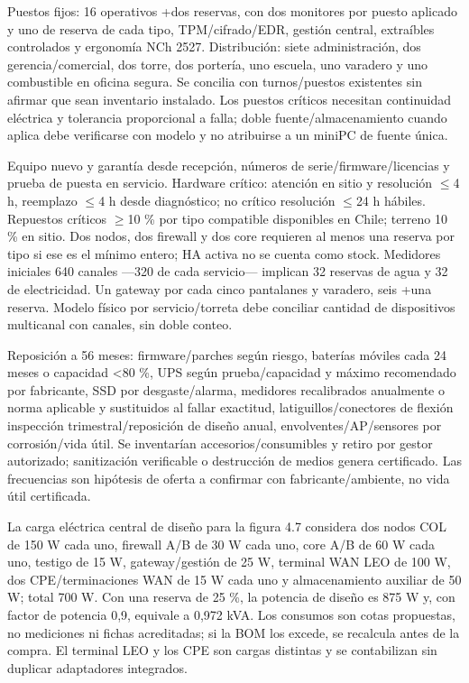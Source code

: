 \documentclass[11pt,letterpaper]{report}
\begin{document}
Puestos fijos: 16 operativos +dos reservas, con dos monitores por puesto aplicado y uno de reserva de cada tipo, TPM/cifrado/EDR, gestión central, extraíbles controlados y ergonomía NCh 2527. Distribución: siete administración, dos gerencia/comercial, dos torre, dos portería, uno escuela, uno varadero y uno combustible en oficina segura. Se concilia con turnos/puestos existentes sin afirmar que sean inventario instalado. Los puestos críticos necesitan continuidad eléctrica y tolerancia proporcional a falla; doble fuente/almacenamiento cuando aplica debe verificarse con modelo y no atribuirse a un miniPC de fuente única.

Equipo nuevo y garantía desde recepción, números de serie/firmware/licencias y prueba de puesta en servicio. Hardware crítico: atención en sitio y resolución $\leq$4 h, reemplazo $\leq$4 h desde diagnóstico; no crítico resolución $\leq$24 h hábiles. Repuestos críticos $\geq$10 \% por tipo compatible disponibles en Chile; terreno 10 \% en sitio. Dos nodos, dos firewall y dos core requieren al menos una reserva por tipo si ese es el mínimo entero; HA activa no se cuenta como stock. Medidores iniciales 640 canales ---320 de cada servicio--- implican 32 reservas de agua y 32 de electricidad. Un gateway por cada cinco pantalanes y varadero, seis +una reserva. Modelo físico por servicio/torreta debe conciliar cantidad de dispositivos multicanal con canales, sin doble conteo.

Reposición a 56 meses: firmware/parches según riesgo, baterías móviles cada 24 meses o capacidad <80 \%, UPS según prueba/capacidad y máximo recomendado por fabricante, SSD por desgaste/alarma, medidores recalibrados anualmente o norma aplicable y sustituidos al fallar exactitud, latiguillos/conectores de flexión inspección trimestral/reposición de diseño anual, envolventes/AP/sensores por corrosión/vida útil. Se inventarían accesorios/consumibles y retiro por gestor autorizado; sanitización verificable o destrucción de medios genera certificado. Las frecuencias son hipótesis de oferta a confirmar con fabricante/ambiente, no vida útil certificada.

La carga eléctrica central de diseño para la figura 4.7 considera dos nodos COL de 150 W cada uno, firewall A/B de 30 W cada uno, core A/B de 60 W cada uno, testigo de 15 W, gateway/gestión de 25 W, terminal WAN LEO de 100 W, dos CPE/terminaciones WAN de 15 W cada uno y almacenamiento auxiliar de 50 W; total 700 W. Con una reserva de 25 \%, la potencia de diseño es 875 W y, con factor de potencia 0,9, equivale a 0,972 kVA. Los consumos son cotas propuestas, no mediciones ni fichas acreditadas; si la BOM los excede, se recalcula antes de la compra. El terminal LEO y los CPE son cargas distintas y se contabilizan sin duplicar adaptadores integrados.
\end{document}
